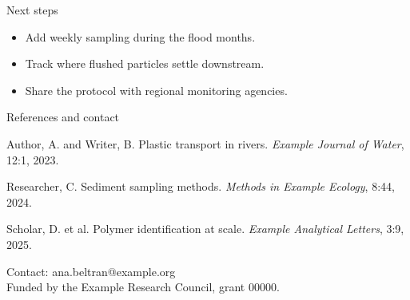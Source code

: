 \documentclass{article}
\newcommand{\smallsize}{\fontsize{28}{35}\selectfont}
\begin{document}
\begin{minipage}[t]{0.485\linewidth}
  \begin{panel}{Next steps}
    \begin{itemize}
      \item Add weekly sampling during the flood months.
      \item Track where flushed particles settle downstream.
      \item Share the protocol with regional monitoring agencies.
    \end{itemize}
  \end{panel}

  \begin{panel}{References and contact}
    \smallsize
    \begin{enumerate}[label={[\arabic*]}]
      \item Author, A. and Writer, B. Plastic transport in rivers. \emph{Example Journal of Water}, 12:1, 2023.
      \item Researcher, C. Sediment sampling methods. \emph{Methods in Example Ecology}, 8:44, 2024.
      \item Scholar, D. et al. Polymer identification at scale. \emph{Example Analytical Letters}, 3:9, 2025.
    \end{enumerate}
    Contact: ana.beltran@example.org\\
    Funded by the Example Research Council, grant 00000.
  \end{panel}
\end{minipage}
\end{document}

